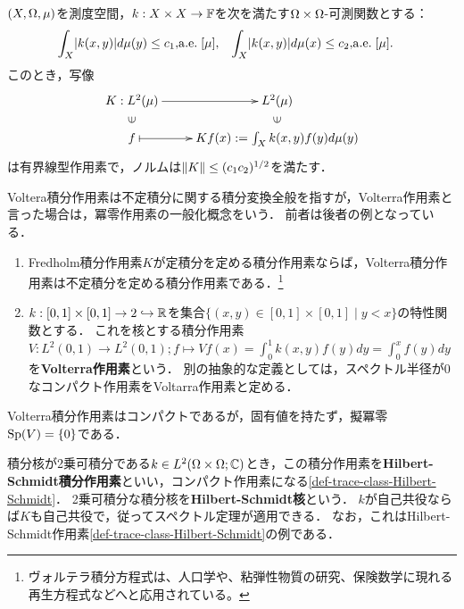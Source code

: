 \documentclass[uplatex,dvipdfmx]{jsreport}
\begin{document}
\begin{theorem}\label{operator-integral-transformation}
    $(X,\Omega,\mu)$を測度空間，$k:X\times X\to\mathbb{F}$を次を満たす$\Omega\times\Omega$-可測関数とする：
    \begin{align*}
        \int_X\lvert k(x,y)\rvert d\mu(y)\le c_1,&\mathrm{a.e.}\;[\mu],&\int_X\lvert k(x,y)\rvert d\mu(x)\le c_2,&\mathrm{a.e.}\;[\mu].
    \end{align*}
    このとき，写像
    \[\xymatrix@R-2pc{
        K:L^2(\mu)\ar[r]&L^2(\mu)\\
        \rotatebox[origin=c]{90}{$\in$}&\rotatebox[origin=c]{90}{$\in$}\\
        f\ar@{|->}[r]&Kf(x):=\int_Xk(x,y)f(y)d\mu(y)
    }\]
    は有界線型作用素で，ノルムは$\|K\|\le(c_1c_2)^{1/2}$を満たす．
\end{theorem}

\begin{example}\label{operator-Volterra}
    Voltera積分作用素は不定積分に関する積分変換全般を指すが，Volterra作用素と言った場合は，冪零作用素の一般化概念をいう．
    前者は後者の例となっている．
    \begin{enumerate}
        \item Fredholm積分作用素$K$が定積分を定める積分作用素ならば，Volterra積分作用素は不定積分を定める積分作用素である．\footnote{ヴォルテラ積分方程式は、人口学や、粘弾性物質の研究、保険数学に現れる再生方程式などへと応用されている。}
        \item $k:[0,1]\times[0,1]\to2\hookrightarrow\mathbb{R}$を集合$\{(x,y)\in[0,1]\times[0,1]\mid y<x\}$の特性関数とする．
        これを核とする積分作用素$V:L^2(0,1)\to L^2(0,1);f\mapsto Vf(x)=\int^1_0k(x,y)f(y)dy=\int^x_0f(y)dy$を\textbf{Volterra作用素}という．
        別の抽象的な定義としては，スペクトル半径が$0$なコンパクト作用素をVoltarra作用素と定める．
    \end{enumerate}
    Volterra積分作用素はコンパクトであるが，固有値を持たず，擬冪零$\mathrm{Sp}(V)=\{0\}$である．
\end{example}

\begin{example}\label{exp-Hilbert-Schmidt}
    積分核が2乗可積分である$k\in L^2(\Omega\times\Omega;\mathbb{C})$とき，この積分作用素を\textbf{Hilbert-Schmidt積分作用素}といい，コンパクト作用素になる\ref{def-trace-class-Hilbert-Schmidt}．
    2乗可積分な積分核を\textbf{Hilbert-Schmidt核}という．
    $k$が自己共役ならば$K$も自己共役で，従ってスペクトル定理が適用できる．
    なお，これはHilbert-Schmidt作用素\ref{def-trace-class-Hilbert-Schmidt}の例である．
\end{example}
\end{document}
